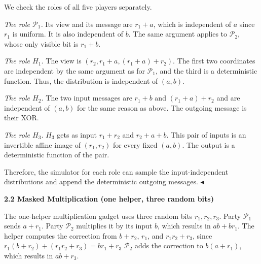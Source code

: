 \documentclass[10pt,a4paper]{article}
\begin{document}
We check the roles of all five players separately.\par




\emph{The role $\mathcal{P}_{1}$.}
Its view and its message are $r_{1}+a$, which is independent of $a$ since $r_{1}$ is uniform. It is also independent of $b$. The same argument applies to $\mathcal{P}_{2}$, whose only visible bit is $r_{1}+b$.\par




\emph{The role $H_{1}$.}
The view is $(r_{2},r_{1}+a,(r_{1}+a)+r_{2})$. The first two coordinates are independent by the same argument as for $\mathcal{P}_{1}$, and the third is a deterministic function. Thus, the distribution is independent of $(a,b)$.\par




\emph{The role $H_{2}$.}
The two input messages are $r_{1}+b$ and $(r_{1}+a)+r_{2}$ and are independent of
$(a,b)$ for the same reason as above. The outgoing message is their XOR.\par




\emph{The role $H_{3}$.}
$H_{3}$ gets as input $r_{1}+r_{2}$ and $r_{2}+a+b$. This pair of inputs is an invertible affine image of $(r_{1},r_{2})$ for every fixed $(a,b)$. The output is a deterministic function of the pair.\par




Therefore, the simulator for each role can sample the input-independent distributions and append the deterministic outgoing messages.
$\blacktriangleleft$\par






\par\medskip\noindent\textbf{
2.2 Masked Multiplication (one helper, three random bits)}\par




The one-helper multiplication gadget uses three random bits $r_{1},r_{2},r_{3}$. Party $\mathcal{P}_{1}$ sends $a+r_{1}$. Party $\mathcal{P}_{2}$ multiplies it by its input $b$, which results in $ab+br_{1}$. The helper computes the correction from $b+r_{2}$, $r_{1}$, and $r_{1}r_{2}+r_{3}$, since
$r_{1}(b+r_{2})+(r_{1}r_{2}+r_{3})=br_{1}+r_{3}$
$\mathcal{P}_{2}$ adds the correction to $b(a+r_{1})$, which results in $ab+r_{3}$.\par
\end{document}
